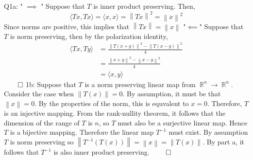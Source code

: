 \documentclass[letterpaper]{article}
\DeclareMathOperator{\R}{\mathbb{R}}
\newcommand{\lan}{\langle}
\newcommand{\ran}{\rangle}
\newcommand{\norm}[1]{\left\lVert#1\right\rVert}
\newcommand{\inn}[1]{\lan#1\ran}
\begin{document}
Q1a: 
\newline " $\implies$ " 
\newline Suppose that $T$ is inner product preserving. Then, 
\begin{equation*}
\inn{Tx,Tx} = \inn{x,x} = \norm{Tx}^2 = \norm{x}^2
\end{equation*}
Since norms are positive, this implies that $\norm{Tx} = \norm{x}$
\newline
"$\impliedby$"
\newline Suppose that $T$ is norm preserving, then by the polarization identity,
\begin{align*}
    \inn{Tx,Ty}  & = \frac{\norm{T(x+y)}^2-\norm{T(x-y)}^2}{4} 
    \\ & = \frac{\norm{x+y}^2-\norm{x-y}^2}{4}
    \\ &= \inn{x,y}
\end{align*}
$\qed$
\newline 1b:
\newline Suppose that $T$ is a norm preserving linear map from $\R^n \rightarrow \R^n$. Consider the case when $\norm{T(x)}=0$. By assumption, it must be that $\norm{x}=0$. By the properties of the norm, this is equvalent to $x=0$. 
Therefore, $T$ is an injective mapping. From the rank-nullity theorem, it follows that the dimension of the range of $T$ is $n$, so $T$ must also be a surjective linear map. Hence $T$ is a bijective mapping. 
Therefore the linear map $T^{-1}$ must exist. By assumption $T$ is norm preserving so $\norm{T^{-1}(T(x))} =\norm{x} = \norm{T(x)}$. By part a, it follows that $T^{-1}$ is also inner product preserving. $\qed$
\end{document}
